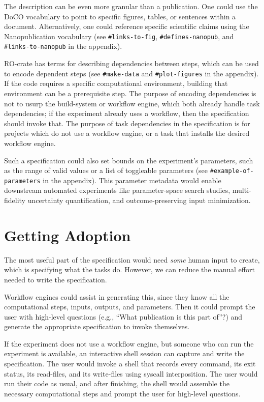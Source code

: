 \documentclass[manuscript]{acmart}
\begin{document}
The description can be even more granular than a publication. One could
use the DoCO vocabulary \cite{constantin_document_2016} to point to
specific figures, tables, or sentences within a document. Alternatively,
one could reference specific scientific claims using the Nanopublication
vocabulary \cite{groth_anatomy_2010} (see \texttt{\#links-to-fig},
\texttt{\#defines-nanopub}, and \texttt{\#links-to-nanopub} in the
appendix).

RO-crate \cite{soiland-reyes_wf4ever_2013} has terms for describing
dependencies between steps, which can be used to encode dependent steps
(see \texttt{\#make-data} and \texttt{\#plot-figures} in the appendix).
If the code requires a specific computational environment, building that
environment can be a prerequisite step. The purpose of encoding
dependencies is not to usurp the build-system or workflow engine, which
both already handle task dependencies; if the experiment already uses a
workflow, then the specification should invoke that. The purpose of task
dependencies in the specification is for projects which do not use a
workflow engine, or a task that installs the desired workflow engine.

Such a specification could also set bounds on the experiment's
parameters, such as the range of valid values or a list of toggleable
parameters (see \texttt{\#example-of-parameters} in the appendix). This
parameter metadata would enable downstream automated experiments like
parameter-space search studies, multi-fidelity uncertainty
quantification, and outcome-preserving input minimization.

\hypertarget{getting-adoption}{%
\section{Getting Adoption}\label{getting-adoption}}

The most useful part of the specification would need \emph{some} human
input to create, which is specifying what the tasks do. However, we can
reduce the manual effort needed to write the specification.

Workflow engines could assist in generating this, since they know all
the computational steps, inputs, outputs, and parameters. Then it could
prompt the user with high-level questions (e.g., ``What publication is
this part of''?) and generate the appropriate specification to invoke
themselves.

If the experiment does not use a workflow engine, but someone who can
run the experiment is available, an interactive shell session can
capture and write the specification. The user would invoke a shell that
records every command, its exit status, its read-files, and its
write-files using syscall interposition. The user would run their code
as usual, and after finishing, the shell would assemble the necessary
computational steps and prompt the user for high-level questions.
\end{document}
